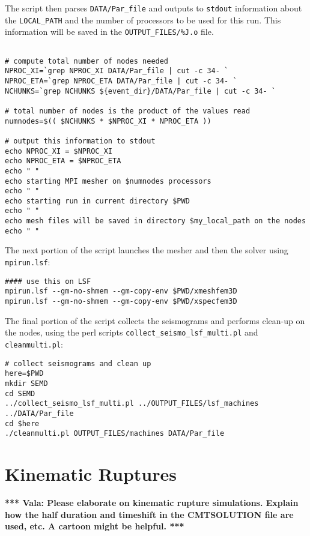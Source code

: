 \documentclass[onecolumn]{article}
\newcommand{\tovala}[1]{\textbf{*** Vala: #1 ***}}
\begin{document}
The script then parses \texttt{DATA/Par\_file} and outputs to
\texttt{stdout} information about the \texttt{LOCAL\_PATH} and the number
of processors to be used for this run.
This information will be saved in the \texttt{OUTPUT\_FILES/\%J.o} file.

{\small
\begin{verbatim}

# compute total number of nodes needed
NPROC_XI=`grep NPROC_XI DATA/Par_file | cut -c 34- `
NPROC_ETA=`grep NPROC_ETA DATA/Par_file | cut -c 34- `
NCHUNKS=`grep NCHUNKS ${event_dir}/DATA/Par_file | cut -c 34- `

# total number of nodes is the product of the values read
numnodes=$(( $NCHUNKS * $NPROC_XI * NPROC_ETA ))

# output this information to stdout
echo NPROC_XI = $NPROC_XI
echo NPROC_ETA = $NPROC_ETA
echo " "
echo starting MPI mesher on $numnodes processors
echo " "
echo starting run in current directory $PWD
echo " "
echo mesh files will be saved in directory $my_local_path on the nodes
echo " "
\end{verbatim}}

The next portion of the script launches the mesher and then the solver
using \texttt{mpirun.lsf}:

{\small
\begin{verbatim}
#### use this on LSF
mpirun.lsf --gm-no-shmem --gm-copy-env $PWD/xmeshfem3D
mpirun.lsf --gm-no-shmem --gm-copy-env $PWD/xspecfem3D
\end{verbatim}}

The final portion of the script collects the seismograms and performs
clean-up on the nodes, using the perl scripts
\texttt{collect\_seismo\_lsf\_multi.pl} and \texttt{cleanmulti.pl}:

{\small
\begin{verbatim}
# collect seismograms and clean up
here=$PWD
mkdir SEMD
cd SEMD
../collect_seismo_lsf_multi.pl ../OUTPUT_FILES/lsf_machines ../DATA/Par_file
cd $here
./cleanmulti.pl OUTPUT_FILES/machines DATA/Par_file
\end{verbatim}
}

\section{Kinematic Ruptures}
\label{section:finitesources}

\tovala{Please elaborate on kinematic rupture simulations. Explain how the half
duration and timeshift in the CMTSOLUTION file are used, etc. A cartoon
might be helpful.}
\end{document}
